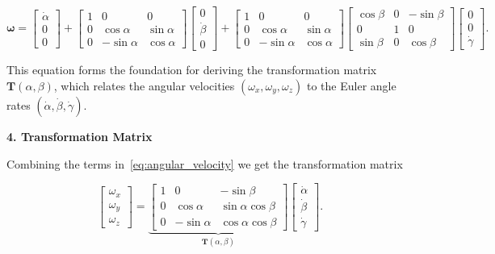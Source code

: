\documentclass[12pt]{article}
\begin{document}
\begin{equation}
\boldsymbol{\omega} =
\begin{bmatrix}
    \dot{\alpha} \\
    0 \\
    0
\end{bmatrix}
+
\begin{bmatrix}
    1 & 0 & 0 \\
    0 & \cos\alpha & \sin\alpha \\
    0 & -\sin\alpha & \cos\alpha
\end{bmatrix}
\begin{bmatrix}
    0 \\
    \dot{\beta} \\
    0
\end{bmatrix}
+
\begin{bmatrix}
    1 & 0 & 0 \\
    0 & \cos\alpha & \sin\alpha \\
    0 & -\sin\alpha & \cos\alpha
\end{bmatrix}
\begin{bmatrix}
    \cos\beta & 0 & -\sin\beta \\
    0 & 1 & 0 \\
    \sin\beta & 0 & \cos\beta
\end{bmatrix}
\begin{bmatrix}
    0 \\
    0 \\
    \dot{\gamma}
\end{bmatrix}.
\end{equation}

This equation forms the foundation for deriving the transformation matrix $\mathbf{T}(\alpha, \beta)$, which relates the angular velocities $(\omega_x, \omega_y, \omega_z)$ to the Euler angle rates $(\dot{\alpha}, \dot{\beta}, \dot{\gamma})$.

\vspace{0.5cm}

\textbf{4. Transformation Matrix}

Combining the terms in~\ref{eq:angular_velocity} we get the transformation matrix

\begin{equation}
    \label{eq:transformation_matrix_corrected}
    \begin{bmatrix}
    \omega_x \\
    \omega_y \\
    \omega_z
    \end{bmatrix}
    =
    \underbrace{
    \begin{bmatrix}
    1 & 0 & -\sin\beta \\
    0 & \cos\alpha & \sin\alpha \cos\beta \\
    0 & -\sin\alpha & \cos\alpha \cos\beta
    \end{bmatrix}
    }_{\mathbf{T}(\alpha, \beta)}
    \begin{bmatrix}
    \dot{\alpha} \\
    \dot{\beta} \\
    \dot{\gamma}
    \end{bmatrix}.
\end{equation}
\end{document}
